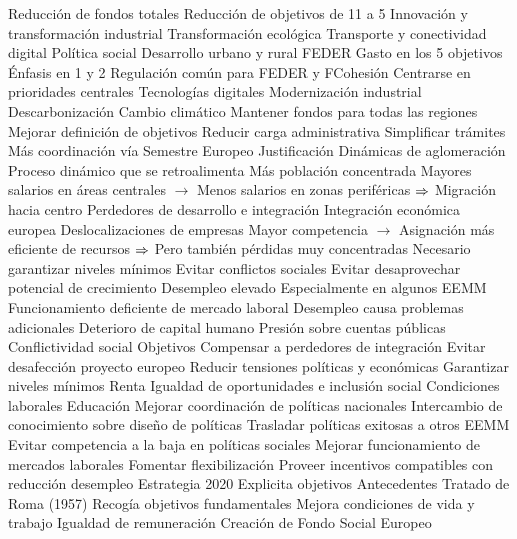 \documentclass{nuevotema}
\begin{document}
\begin{esquemal}
				\4 Reducción de fondos totales
				\4 Reducción de objetivos de 11 a 5
				\4[1] Innovación y transformación industrial
				\4[2] Transformación ecológica
				\4[3] Transporte y conectividad digital
				\4[4] Política social
				\4[5] Desarrollo urbano y rural
				\4 FEDER
				\4[] Gasto en los 5 objetivos
				\4[] Énfasis en 1 y 2
				\4 Regulación común para FEDER y FCohesión
				\4 Centrarse en prioridades centrales
				\4[] Tecnologías digitales
				\4[] Modernización industrial
				\4[] Descarbonización
				\4[] Cambio climático
				\4 Mantener fondos para todas las regiones
				\4 Mejorar definición de objetivos
				\4 Reducir carga administrativa
				\4 Simplificar trámites
				\4 Más coordinación vía Semestre Europeo
	\1 
		\2 Justificación
			\3 Dinámicas de aglomeración
				\4 Proceso dinámico que se retroalimenta
				\4 Más población concentrada
				\4[] Mayores salarios en áreas centrales
				\4[] $\to$ Menos salarios en zonas periféricas
				\4[] $\Rightarrow$ Migración hacia centro
			\3 Perdedores de desarrollo e integración
				\4 Integración económica europea
				\4[] Deslocalizaciones de empresas
				\4[] Mayor competencia
				\4[] $\to$ Asignación más eficiente de recursos
				\4[] $\Rightarrow$ Pero también pérdidas muy concentradas
			\3 Necesario garantizar niveles mínimos
				\4 Evitar conflictos sociales
				\4 Evitar desaprovechar potencial de crecimiento
			\3 Desempleo elevado
				\4 Especialmente en algunos EEMM
				\4 Funcionamiento deficiente de mercado laboral
				\4 Desempleo causa problemas adicionales
				\4[] Deterioro de capital humano
				\4[] Presión sobre cuentas públicas
				\4[] Conflictividad social
		\2 Objetivos
			\3 Compensar a perdedores de integración
				\4 Evitar desafección proyecto europeo
				\4 Reducir tensiones políticas y económicas
			\3 Garantizar niveles mínimos
				\4 Renta
				\4 Igualdad de oportunidades e inclusión social
				\4 Condiciones laborales
				\4 Educación
			\3 Mejorar coordinación de políticas nacionales
				\4 Intercambio de conocimiento sobre diseño de políticas
				\4 Trasladar políticas exitosas a otros EEMM
				\4 Evitar competencia a la baja en políticas sociales
			\3 Mejorar funcionamiento de mercados laborales
				\4 Fomentar flexibilización
				\4 Proveer incentivos compatibles con reducción desempleo
			\3 Estrategia 2020
				\4 Explicita objetivos
		\2 Antecedentes
			\3 Tratado de Roma (1957)
				\4 Recogía objetivos fundamentales
				\4[] Mejora condiciones de vida y trabajo
				\4[] Igualdad de remuneración
				\4 Creación de Fondo Social Europeo

\end{esquemal}
\end{document}
